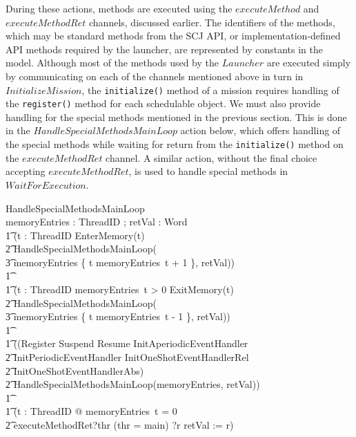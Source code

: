During these actions, methods are executed using the $executeMethod$
and $executeMethodRet$ channels, discussed earlier.
The identifiers of the methods, which may be standard methods from the
SCJ API, or implementation-defined API methods required by the
launcher, are represented by constants in the model.
Although most of the methods used by the $Launcher$ are executed
simply by communicating on each of the channels mentioned above in
turn in $InitializeMission$, the \texttt{initialize()} method of a
mission requires handling of the \texttt{register()} method for each
schedulable object.
We must also provide handling for the special methods mentioned in the
previous section.
This is done in the $HandleSpecialMethodsMainLoop$ action below, which
offers handling of the special methods while waiting for return from
the \texttt{initialize()} method on the $executeMethodRet$ channel.
A similar action, without the final choice accepting
$executeMethodRet$, is used to handle special methods in
$WaitForExecution$.
\begin{circusaction}
  HandleSpecialMethodsMainLoop \circdef \\
  \circval memoryEntries : ThreadID \fun \nat; \circres retVal : Word \circspot \\
  \t1 (\Extchoice t : ThreadID \circspot EnterMemory(t) \circseq \\
  \t2 HandleSpecialMethodsMainLoop(\\
  \t3 memoryEntries \oplus \{ t \mapsto memoryEntries~t + 1 \}, retVal)) \\
  \t1 {} \extchoice {} \\
  \t1 (\Extchoice t : ThreadID \circspot \lcircguard memoryEntries~t > 0 \rcircguard \circguard ExitMemory(t) \circseq \\
  \t2 HandleSpecialMethodsMainLoop(\\
  \t3 memoryEntries \oplus \{ t \mapsto memoryEntries~t - 1 \}, retVal)) \\
  \t1 {} \extchoice {} \\
  \t1 ((Register \extchoice Suspend \extchoice Resume \extchoice InitAperiodicEventHandler \\
  \t2 {} \extchoice InitPeriodicEventHandler \extchoice InitOneShotEventHandlerRel \\
  \t2 {} \extchoice InitOneShotEventHandlerAbs) \circseq \\
  \t2 HandleSpecialMethodsMainLoop(memoryEntries, retVal)) \\
  \t1 {} \extchoice {} \\
  \t1 (\lcircguard \forall t : ThreadID @ memoryEntries~t = 0 \rcircguard \circguard {} \\
  \t2 executeMethodRet?thr \prefixcolon (thr = main) ?r \then retVal := r)
\end{circusaction}
